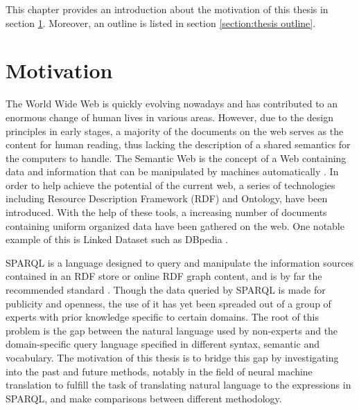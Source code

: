 

This chapter provides an introduction about the motivation of this thesis in section \ref{section:motivation}. Moreover, an outline is listed in section \ref{section:thesis outline}.


\section{Motivation} \label{section:motivation}
The World Wide Web is quickly evolving nowadays and has contributed to an enormous change of human lives in various areas. However, due to the design principles in early stages, a majority of the documents on the web serves as the content for human reading, thus lacking the description of a shared semantics for the computers to handle. The Semantic Web is the concept of a Web containing data and information that can be manipulated by machines automatically \cite{Shadbolt2006}. In order to help achieve the potential of the current web, a series of technologies including Resource Description Framework (RDF) and Ontology, have been introduced. With the help of these tools, a increasing number of documents containing uniform organized data have been gathered on the web. One notable example of this is Linked Dataset such as DBpedia \cite{Auer2007}. 

SPARQL is a language designed to query and manipulate the information sources contained in an RDF store or online RDF graph content, and is by far the recommended standard \cite{Harris2013}. Though the data queried by SPARQL is made for publicity and openness, the use of it has yet been spreaded out of a group of experts with prior knowledge specific to certain domains. The root of this problem is the gap between the natural language used by non-experts and the domain-specific query language specified in different syntax, semantic and vocabulary. The motivation of this thesis is to bridge this gap by investigating into the past and future methods, notably in the field of neural machine translation to fulfill the task of translating natural language to the expressions in SPARQL, and make comparisons between different methodology. 

